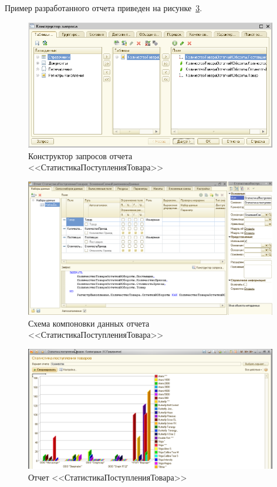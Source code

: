 Пример разработанного отчета приведен на рисунке~\ref{fig:report_stats}.

\begin{figure}[h!]
  \centering
  \includegraphics[width=110mm]{pic/report_stats_query}
  \caption{Конструктор запросов отчета \\ <<СтатистикаПоступленияТовара>>}
  \label{fig:report_stats_query}
\end{figure}

\begin{figure}[h!]
  \centering
  \includegraphics[width=110mm]{pic/report_stats_scheme}
  \caption{Схема компоновки данных отчета \\ <<СтатистикаПоступленияТовара>>}
  \label{fig:report_stats_scheme}
\end{figure}

\begin{figure}[h!]
  \centering
  \includegraphics[width=110mm]{pic/report_stats}
  \caption{Отчет <<СтатистикаПоступленияТовара>>}
  \label{fig:report_stats}
\end{figure}

